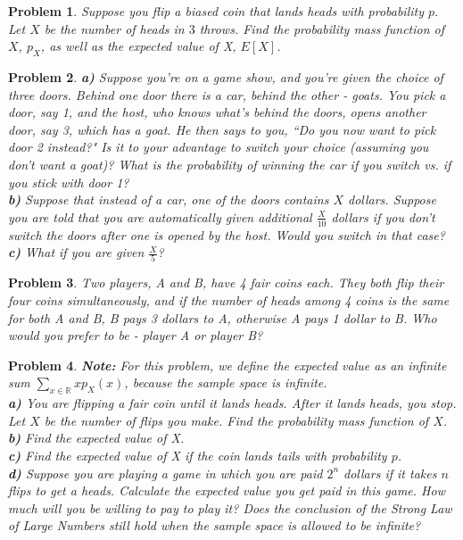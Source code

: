\documentclass[a4paper,12pt]{article}
\theoremstyle{perfect}
\newtheorem{prb}{Problem}
\newcommand{\R}{\mathbb{R}}
\begin{document}
\begin{prb}
Suppose you flip a biased coin that lands heads with probability $p$. Let $X$ be the number of heads in $3$ throws. Find the probability mass function of $X$, $p_X$, as well as the expected value of X, $E[X]$.
\end{prb}
 
\begin{prb} 
\textbf{a)} Suppose you're on a game show, and you're given the choice of three doors. Behind one door there is a car, behind the other - goats. You pick a door, say 1, and the host, who knows what's behind the doors, opens another door, say 3, which has a goat. He then says to you, ``Do you now want to pick door 2 instead?" Is it to your advantage to switch your choice (assuming you don't want a goat)? What is the probability of winning the car if you switch vs. if you stick with door 1? \\
\noindent
\textbf{b)} Suppose that instead of a car, one of the doors contains $X$ dollars. Suppose you are told that you are automatically given additional $\frac{X}{10}$ dollars if you don't switch the doors after one is opened by the host. Would you switch in that case? \\
\textbf{c)} What if you are given $\frac{X}{5}$?
 \end{prb}

\begin{prb}
Two players, A and B, have 4 fair coins each. They both flip their four coins simultaneously, and if the number of heads among 4 coins is the same for both A and B, B pays 3 dollars to A, otherwise A pays 1 dollar to B. Who would you prefer to be - player A or player B?
\end{prb}

\begin{prb}
\textbf{Note:} For this problem, we define the expected value as an infinite sum $\sum_{x \in \R} xp_X(x)$, because the sample space is infinite. \\
\textbf{a)} You are flipping a fair coin until it lands heads. After it lands heads, you stop. Let $X$ be the number of flips you make. Find the probability mass function of $X$. 
\newline
\textbf{b)} Find the expected value of X.  \\
\textbf{c)} Find the expected value of X if the coin lands tails with probability $p$. \\
\textbf{d)} Suppose you are playing a game in which you are paid $2^n$ dollars if it takes $n$ flips to get a heads. Calculate the expected value you get paid in this game. How much will you be willing to pay to play it? Does the conclusion of the Strong Law of Large Numbers still hold when the sample space is allowed to be infinite?
\end{prb}
\end{document}
